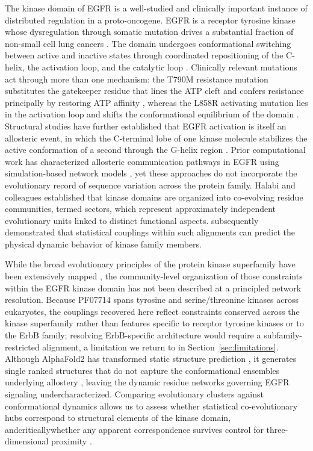 \documentclass[utf8]{FrontiersinHarvard}
\begin{document}
The kinase domain of EGFR is a well-studied and clinically important instance of distributed regulation in a proto-oncogene. EGFR is a receptor tyrosine kinase whose dysregulation through somatic mutation drives a substantial fraction of non-small cell lung cancers \citep{Zhang2016}. The domain undergoes conformational switching between active and inactive states through coordinated repositioning of the \textalpha{}C-helix, the activation loop, and the catalytic loop \citep{Zhang2006}. Clinically relevant mutations act through more than one mechanism: the T790M resistance mutation substitutes the gatekeeper residue that lines the ATP cleft and confers resistance principally by restoring ATP affinity \citep{Yun2008}, whereas the L858R activating mutation lies in the activation loop and shifts the conformational equilibrium of the domain \citep{Behn2025}. Structural studies have further established that EGFR activation is itself an allosteric event, in which the C-terminal lobe of one kinase molecule stabilizes the active conformation of a second through the \textalpha{}G-helix region \citep{Zhang2006,Jura2009}. Prior computational work has characterized allosteric communication pathways in EGFR using simulation-based network models \citep{DixitVerkhivker2011}, yet these approaches do not incorporate the evolutionary record of sequence variation across the protein family. Halabi and colleagues \citep{Halabi2009} established that kinase domains are organized into co-evolving residue communities, termed sectors, which represent approximately independent evolutionary units linked to distinct functional aspects. \citet{Sutto2015} subsequently demonstrated that statistical couplings within such alignments can predict the physical dynamic behavior of kinase family members.

While the broad evolutionary principles of the protein kinase superfamily have been extensively mapped \citep{Halabi2009,Sutto2015}, the community-level organization of those constraints within the EGFR kinase domain has not been described at a principled network resolution. Because PF07714 spans tyrosine and serine/threonine kinases across eukaryotes, the couplings recovered here reflect constraints conserved across the kinase superfamily rather than features specific to receptor tyrosine kinases or to the ErbB family; resolving ErbB-specific architecture would require a subfamily-restricted alignment, a limitation we return to in Section~\ref{sec:limitations}. Although AlphaFold2 has transformed static structure prediction \citep{Jumper2021}, it generates single ranked structures that do not capture the conformational ensembles underlying allostery \citep{Nussinov2022,Bowman2024}, leaving the dynamic residue networks governing EGFR signaling undercharacterized. Comparing evolutionary clusters against conformational dynamics allows us to assess whether statistical co-evolutionary hubs correspond to structural elements of the kinase domain, and\textemdash critically\textemdash whether any apparent correspondence survives control for three-dimensional proximity \citep{Sutto2015}.
\end{document}
